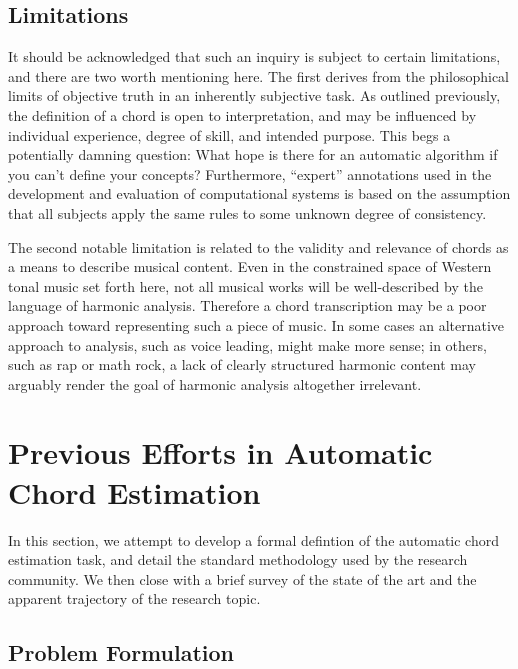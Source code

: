 \subsection{Limitations}
\label{subsec:limitations}
It should be acknowledged that such an inquiry is subject to certain limitations, and there are two worth mentioning here.
The first derives from the philosophical limits of objective truth in an inherently subjective task.
As outlined previously, the definition of a chord is open to interpretation, and may be influenced by individual experience, degree of skill, and intended purpose.
This begs a potentially damning question: What hope is there for an automatic algorithm if you can't define your concepts?
Furthermore, ``expert'' annotations used in the development and evaluation of computational systems is based on the assumption that all subjects apply the same rules to some unknown degree of consistency.

The second notable limitation is related to the validity and relevance of chords as a means to describe musical content.
Even in the constrained space of Western tonal music set forth here, not all musical works will be well-described by the language of harmonic analysis.
Therefore a chord transcription may be a poor approach toward representing such a piece of music.
In some cases an alternative approach to analysis, such as voice leading, might make more sense; in others, such as rap or math rock, a lack of clearly structured harmonic content may arguably render the goal of harmonic analysis altogether irrelevant.


\section{Previous Efforts in Automatic Chord Estimation}
\label{sec:background}

In this section, we attempt to develop a formal defintion of the automatic chord estimation task, and detail the standard methodology used by the research community.
We then close with a brief survey of the state of the art and the apparent trajectory of the research topic.


\subsection{Problem Formulation}
\label{subsec:problem_formulation}

